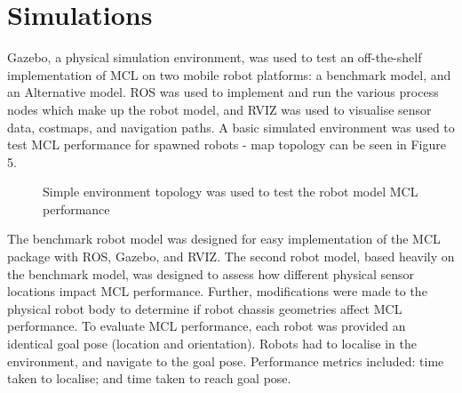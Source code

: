 \documentclass[a4paper]{article}
\begin{document}
\section{Simulations}
Gazebo, a physical simulation environment, was used to test an off-the-shelf implementation of MCL on two mobile robot platforms: a benchmark model, and an Alternative model. ROS was used to implement and run the various process nodes which make up the robot model, and RVIZ was used to visualise sensor data, costmaps, and navigation paths. A basic simulated environment was used to test MCL performance for spawned robots - map topology can be seen in Figure 5.
\begin{figure}[h]
\centering
{}
\caption{Simple environment topology was used to test the robot model MCL performance}
\end{figure}

The benchmark robot model was designed for easy implementation of the MCL package with ROS, Gazebo, and RVIZ. The second robot model, based heavily on the benchmark model, was designed to assess how different physical sensor locations impact MCL performance. Further, modifications were made to the physical robot body to determine if robot chassis geometries affect MCL performance. To evaluate MCL performance, each robot was provided an identical goal pose (location and orientation). Robots had to localise in the environment, and navigate to the goal pose. Performance metrics included: time taken to localise; and time taken to reach goal pose.
\end{document}
